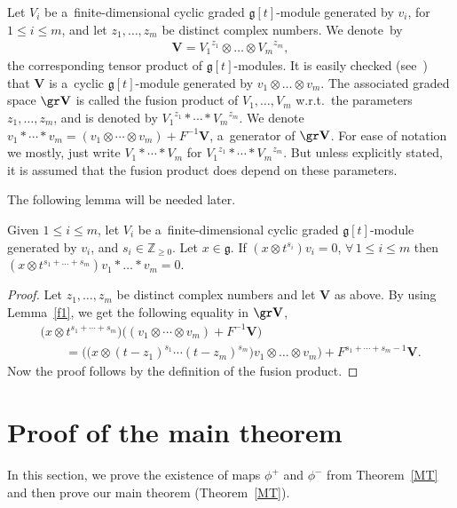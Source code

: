 Let $V_i$ be a~f\/inite-dimensional cyclic graded $\mathfrak{g}[t]$-module generated by $v_i$, for $1\leq i\leq m$, and
let $z_1,\dots,z_m$ be distinct complex numbers.
We denote~by
\begin{gather*}
\mathbf{V}={V_1}^{z_1}\otimes\dots\otimes {V_m}^{z_m},
\end{gather*}
the corresponding tensor product of $\mathfrak{g}[t]$-modules.
It is easily checked (see~\cite[Proposition 1.4]{FL}) that $\mathbf{V}$ is a~cyclic $\mathfrak{g}[t]$-module generated
by $v_1\otimes\dots\otimes v_m$.
The associated graded space $\gr \mathbf{V}$ is called the fusion product of $V_1,\dots,V_m$ w.r.t.\ the parameters
$z_1,\dots,z_m$, and is denoted by ${V_1}^{z_1}*\cdots*{V_m}^{z_m}$.
We denote $v_1*\cdots*v_m=(v_1\otimes\cdots\otimes v_m)+F^{-1}\mathbf{V}$, a~generator of $\gr \mathbf{V}$.
For ease of notation we mostly, just write $V_1*\cdots*V_m$ for ${V_1}^{z_1}*\cdots*{V_m}^{z_m}$.
But unless explicitly stated, it is assumed that the fusion product does depend on these parameters.

The following lemma will be needed later.
\begin{lemma}
\label{f2}
Given $1\leq i\leq m$, let $V_i$ be a~finite-dimensional cyclic graded $\mathfrak{g}[t]$-module generated by $v_i$, and
$s_i\in\mathbb{Z}_{\geq0}$.
Let $x\in\mathfrak{g}$.
If $(x\otimes t^{s_i})v_i=0$, $\forall\, 1\leq i\leq m$ then $(x\otimes t^{s_1+\dots+s_m}) v_1*\dots*v_m=0$.
\end{lemma}
\begin{proof}
Let $z_1,\dots,z_m$ be distinct complex numbers and let $\mathbf{V}$ as above.
By using Lemma~\ref{f1}, we get the following equality in $\gr \mathbf{V}$,
\begin{gather*}
\big(x\otimes t^{s_1+\cdots+s_m}\big) \big((v_1\otimes\cdots\otimes v_m)+F^{-1}\mathbf{V}\big)
\\
\qquad{}
=\big(\big(x\otimes (t-z_1)^{s_1}\cdots(t-z_m)^{s_m}\big)v_1\otimes\dots\otimes v_m\big) + F^{s_1+\cdots+s_m-1}\mathbf{V}.
\end{gather*}
Now the proof follows by the def\/inition of the fusion product.
\end{proof}

\section{Proof of the main theorem}\label{section4}

In this section, we prove the existence of maps $\phi^{+}$ and $\phi^{-}$ from Theorem~\ref{MT} and then prove our main
theorem (Theorem~\ref{MT}).

